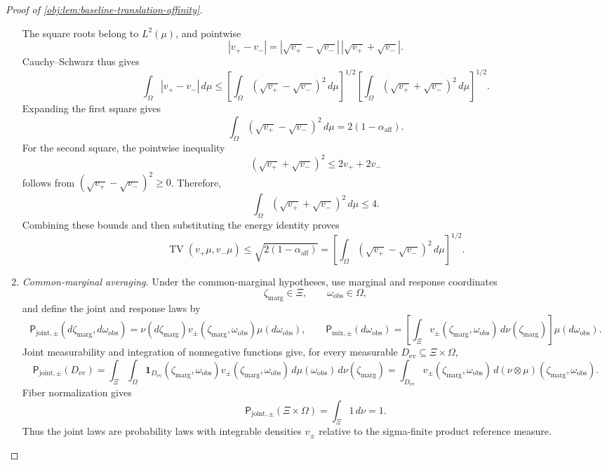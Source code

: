 \begin{proof}[Proof of \cref{obj:lem:baseline-translation-affinity}]
\begin{enumerate}
The square roots belong to \(L^2(\mu)\), and pointwise
\[
|v_+-v_-|
=|\sqrt{v_+}-\sqrt{v_-}|\,
 |\sqrt{v_+}+\sqrt{v_-}|.
\]
Cauchy--Schwarz thus gives
\[
\int_\Omega|v_+-v_-|\,d\mu
\le
\left[\int_\Omega(\sqrt{v_+}-\sqrt{v_-})^2\,d\mu\right]^{1/2}
\left[\int_\Omega(\sqrt{v_+}+\sqrt{v_-})^2\,d\mu\right]^{1/2}.
\]
Expanding the first square gives
\[
\int_\Omega(\sqrt{v_+}-\sqrt{v_-})^2\,d\mu
=2(1-\alpha_{\mathrm{aff}}).
\]
For the second square, the pointwise inequality
\[
(\sqrt{v_+}+\sqrt{v_-})^2\le2v_++2v_-
\]
follows from \((\sqrt{v_+}-\sqrt{v_-})^2\ge0\). Therefore,
\[
\int_\Omega(\sqrt{v_+}+\sqrt{v_-})^2\,d\mu\le4.
\]
Combining these bounds and then substituting the energy identity proves
\[
\operatorname{TV}(v_+\mu,v_-\mu)
\le\sqrt{2(1-\alpha_{\mathrm{aff}})}
=
\left[\int_\Omega(\sqrt{v_+}-\sqrt{v_-})^2\,d\mu\right]^{1/2}.
\]

\item \emph{Common-marginal averaging.}
Under the common-marginal hypotheses, use marginal and response coordinates
\[
\zeta_{\mathrm{marg}}\in\Xi,
\qquad
\omega_{\mathrm{obs}}\in\Omega,
\]
and define the joint and response laws by
\[
\mathsf P_{\mathrm{joint},\pm}(d\zeta_{\mathrm{marg}},d\omega_{\mathrm{obs}})
=\nu(d\zeta_{\mathrm{marg}})v_\pm(\zeta_{\mathrm{marg}},\omega_{\mathrm{obs}})\mu(d\omega_{\mathrm{obs}}),
\qquad
\mathsf P_{\mathrm{mix},\pm}(d\omega_{\mathrm{obs}})
=\left[\int_\Xi v_\pm(\zeta_{\mathrm{marg}},\omega_{\mathrm{obs}})\,d\nu(\zeta_{\mathrm{marg}})\right]\mu(d\omega_{\mathrm{obs}}).
\]
Joint measurability and integration of nonnegative functions give, for every measurable
\(D_{\mathrm{ev}}\subseteq\Xi\times\Omega\),
\[
\mathsf P_{\mathrm{joint},\pm}(D_{\mathrm{ev}})
=\int_\Xi\int_\Omega
\mathbf1_{D_{\mathrm{ev}}}(\zeta_{\mathrm{marg}},\omega_{\mathrm{obs}})v_\pm(\zeta_{\mathrm{marg}},\omega_{\mathrm{obs}})\,d\mu(\omega_{\mathrm{obs}})\,d\nu(\zeta_{\mathrm{marg}})
=\int_{D_{\mathrm{ev}}}v_\pm(\zeta_{\mathrm{marg}},\omega_{\mathrm{obs}})\,d(\nu\otimes\mu)(\zeta_{\mathrm{marg}},\omega_{\mathrm{obs}}).
\]
Fiber normalization gives
\[
\mathsf P_{\mathrm{joint},\pm}(\Xi\times\Omega)
=\int_\Xi 1\,d\nu=1.
\]
Thus the joint laws are probability laws with integrable densities \(v_\pm\) relative to the sigma-finite product reference measure.


\end{enumerate}
\end{proof}
